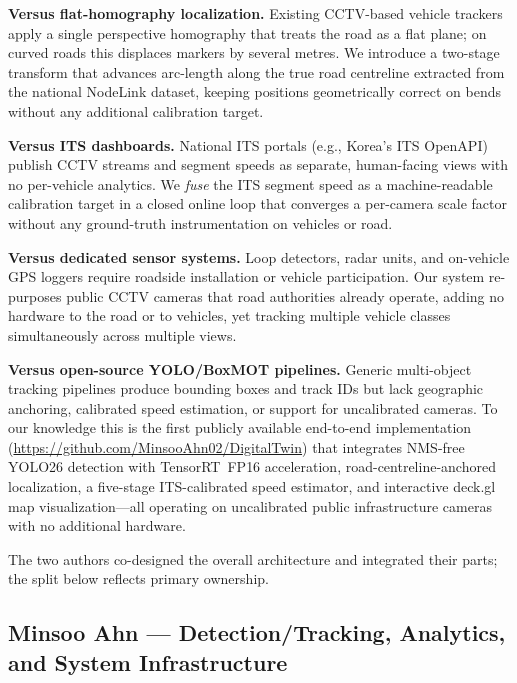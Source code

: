 \documentclass[conference]{IEEEtran}
\renewcommand{\_}{\textunderscore\allowbreak}
\begin{document}
\textbf{Versus flat-homography localization.} Existing CCTV-based vehicle trackers
apply a single perspective homography that treats the road as a flat plane; on
curved roads this displaces markers by several metres.
We introduce a two-stage transform that advances arc-length along the true road
centreline extracted from the national NodeLink dataset, keeping positions
geometrically correct on bends without any additional calibration target.

\textbf{Versus ITS dashboards.} National ITS portals (e.g., Korea's ITS OpenAPI)
publish CCTV streams and segment speeds as separate, human-facing views with no
per-vehicle analytics.
We \emph{fuse} the ITS segment speed as a machine-readable calibration target in
a closed online loop that converges a per-camera scale factor without any
ground-truth instrumentation on vehicles or road.

\textbf{Versus dedicated sensor systems.} Loop detectors, radar units, and
on-vehicle GPS loggers require roadside installation or vehicle participation.
Our system re-purposes public CCTV cameras that road authorities already operate,
adding no hardware to the road or to vehicles, yet tracking multiple vehicle
classes simultaneously across multiple views.

\textbf{Versus open-source YOLO/BoxMOT pipelines.} Generic multi-object tracking
pipelines produce bounding boxes and track IDs but lack geographic anchoring,
calibrated speed estimation, or support for uncalibrated cameras.
To our knowledge this is the first publicly available end-to-end implementation
(\url{https://github.com/MinsooAhn02/DigitalTwin}) that integrates NMS-free
YOLO26 detection with TensorRT~FP16 acceleration, road-centreline-anchored
localization, a five-stage ITS-calibrated speed estimator, and interactive
deck.gl map visualization---all operating on uncalibrated public infrastructure
cameras with no additional hardware.

The two authors co-designed the overall architecture and integrated their parts;
the split below reflects primary ownership.

\subsection*{Minsoo Ahn --- Detection/Tracking, Analytics, and System Infrastructure}
\end{document}
